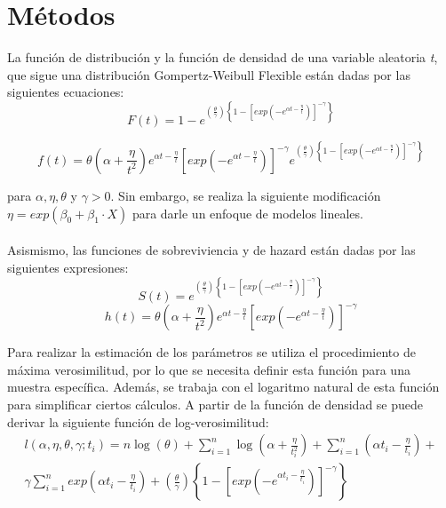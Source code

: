 \documentclass[12pt,a4paper]{article}
\begin{document}
\section{Métodos}
La función de distribución y la función de densidad de una variable aleatoria \textit{t}, que sigue una distribución Gompertz-Weibull Flexible están dadas por las siguientes ecuaciones:
\begin{equation}
F(t)= 1-e^{\left( \frac{\theta}{\gamma}\right )\left \{1- \left [ exp \left ( -e^{\alpha t - \frac{\eta}{t} } \right ) \right ]^{-\gamma} \right \}}
\end{equation}

\begin{equation}
f(t)= \theta \left ( \alpha + \frac{\eta}{t^2} \right ) e^{\alpha t - \frac{\eta}{t}} \left [ exp \left ( -e^{\alpha t - \frac{\eta}{t} } \right ) \right ]^{-\gamma} e^{\left( \frac{\theta}{\gamma}\right )\left \{1- \left [ exp \left ( -e^{\alpha t - \frac{\eta}{t} } \right ) \right ]^{-\gamma} \right \}}
\end{equation}

para $\alpha, \eta, \theta$ y $\gamma > 0$. Sin embargo, se realiza la siguiente modificación $\eta = exp(\beta_0+\beta_1\cdot X)$ para darle un enfoque de modelos lineales.\\
\\
Asismismo, las funciones de sobreviviencia y de hazard están dadas por las siguientes expresiones:
\begin{equation}
S(t)= e^{\left( \frac{\theta}{\gamma}\right )\left \{1- \left [ exp \left ( -e^{\alpha t - \frac{\eta}{t} } \right ) \right ]^{-\gamma} \right \}}
\end{equation}
\begin{equation}
h(t)= \theta \left ( \alpha + \frac{\eta}{t^2} \right )e^{\alpha t - \frac{\eta}{t} }\left [ exp \left ( -e^{\alpha t - \frac{\eta}{t} } \right ) \right ]^{-\gamma}
\end{equation}

Para realizar la estimación de los parámetros se utiliza el procedimiento de máxima verosimilitud, por lo que se necesita definir esta función para una muestra específica. Además, se trabaja con el logaritmo natural de esta función para simplificar ciertos cálculos.  A partir de la función de densidad se puede derivar la siguiente función de log-verosimilitud:
\begin{gather}
l(\alpha, \eta, \theta, \gamma;t_{i}) = n \log(\theta)+ \sum_{i=1}^{n} \log \left ( \alpha+\frac{\eta}{t_{i}^{2}}\right )+  \sum_{i=1}^{n}\left ( \alpha t_{i}-\frac{\eta}{t_{i}}\right ) + \nonumber\\ \gamma \sum_{i=1}^{n} exp\left ( \alpha t_{i}-\frac{\eta}{t_{i}}\right) 
 + \left( \frac{\theta}{\gamma}\right ) \left \{1- \left [ exp \left ( -e^{\alpha t_i - \frac{\eta}{t_i} } \right ) \right ]^{-\gamma} \right \} 
\end{gather}
\end{document}
